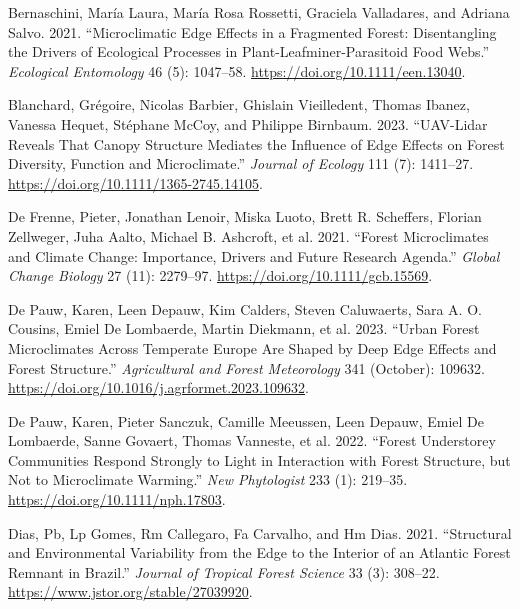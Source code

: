 \documentclass[
  12pt,
]{article}
\newlength{\cslhangindent}
\newenvironment{CSLReferences}[2] %
 {\begin{list}{}{%
  \setlength{\itemindent}{0pt}
  \setlength{\leftmargin}{0pt}
  \setlength{\parsep}{0pt}
  \ifodd #1
   \setlength{\leftmargin}{\cslhangindent}
   \setlength{\itemindent}{-1\cslhangindent}
  \fi
  \setlength{\itemsep}{#2\baselineskip}}}
 {\end{list}}
\begin{document}
\begin{CSLReferences}{1}{0}
Bernaschini, María Laura, María Rosa Rossetti, Graciela Valladares, and
Adriana Salvo. 2021. {``Microclimatic Edge Effects in a Fragmented
Forest: Disentangling the Drivers of Ecological Processes in
Plant-Leafminer-Parasitoid Food Webs.''} \emph{Ecological Entomology} 46
(5): 1047--58. \url{https://doi.org/10.1111/een.13040}.

Blanchard, Grégoire, Nicolas Barbier, Ghislain Vieilledent, Thomas
Ibanez, Vanessa Hequet, Stéphane McCoy, and Philippe Birnbaum. 2023.
{``{UAV}-{Lidar} Reveals That Canopy Structure Mediates the Influence of
Edge Effects on Forest Diversity, Function and Microclimate.''}
\emph{Journal of Ecology} 111 (7): 1411--27.
\url{https://doi.org/10.1111/1365-2745.14105}.

De Frenne, Pieter, Jonathan Lenoir, Miska Luoto, Brett R. Scheffers,
Florian Zellweger, Juha Aalto, Michael B. Ashcroft, et al. 2021.
{``Forest Microclimates and Climate Change: {Importance}, Drivers and
Future Research Agenda.''} \emph{Global Change Biology} 27 (11):
2279--97. \url{https://doi.org/10.1111/gcb.15569}.

De Pauw, Karen, Leen Depauw, Kim Calders, Steven Caluwaerts, Sara A. O.
Cousins, Emiel De Lombaerde, Martin Diekmann, et al. 2023. {``Urban
Forest Microclimates Across Temperate {Europe} Are Shaped by Deep Edge
Effects and Forest Structure.''} \emph{Agricultural and Forest
Meteorology} 341 (October): 109632.
\url{https://doi.org/10.1016/j.agrformet.2023.109632}.

De Pauw, Karen, Pieter Sanczuk, Camille Meeussen, Leen Depauw, Emiel De
Lombaerde, Sanne Govaert, Thomas Vanneste, et al. 2022. {``Forest
Understorey Communities Respond Strongly to Light in Interaction with
Forest Structure, but Not to Microclimate Warming.''} \emph{New
Phytologist} 233 (1): 219--35. \url{https://doi.org/10.1111/nph.17803}.

Dias, Pb, Lp Gomes, Rm Callegaro, Fa Carvalho, and Hm Dias. 2021.
{``Structural and {Environmental} {Variability} from the {Edge} to the
{Interior} of an {Atlantic} {Forest} {Remnant} in {Brazil}.''}
\emph{Journal of Tropical Forest Science} 33 (3): 308--22.
\url{https://www.jstor.org/stable/27039920}.


\end{CSLReferences}
\end{document}
